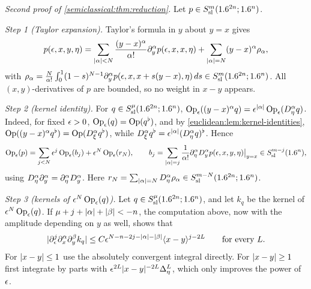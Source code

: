 \emph{Second proof of \cref{semiclassical:thm:reduction}.} Let $p\in S^{m}_{\mathrm{sl}}(1.6^{2n};1.6^n)$.

\emph{Step 1 (Taylor expansion).} Taylor's formula in $y$ about $y=x$ gives
\begin{equation*}
p(\epsilon,x,y,\eta)=\sum_{\lvert \alpha\rvert<N}\frac{(y-x)^\alpha}{\alpha!}\partial^\alpha_yp(\epsilon,x,x,\eta)+\sum_{\lvert \alpha\rvert=N}(y-x)^\alpha\rho_\alpha,
\end{equation*}
with $\rho_\alpha=\frac N{\alpha!}\int_0^1(1-s)^{N-1}\partial^\alpha_yp(\epsilon,x,x+s(y-x),\eta)\,ds\in S^{m}_{\mathrm{sl}}(1.6^{2n};1.6^n)$. All
$(x,y)$-derivatives of $p$ are bounded, so no weight in $x-y$ appears.

\emph{Step 2 (kernel identity).} For $q\in S^{\mu}_{\mathrm{sl}}(1.6^{2n};1.6^n)$,
$\operatorname{Op}_\epsilon((y-x)^\alpha q)=\epsilon^{\lvert \alpha\rvert}\operatorname{Op}_\epsilon(D^\alpha_\eta q)$. Indeed, for fixed $\epsilon>0$,
$\operatorname{Op}_\epsilon(q)=\operatorname{Op}(q^\flat)$, and by \cref{euclidean:lem:kernel-identities},
$\operatorname{Op}((y-x)^\alpha q^\flat)=\operatorname{Op}(D^\alpha_\xi q^\flat)$, while $D^\alpha_\xi q^\flat=\epsilon^{\lvert \alpha\rvert}(D^\alpha_\eta q)^\flat$. Hence
\begin{equation*}
\operatorname{Op}_\epsilon(p)=\sum_{j<N}\epsilon^j\operatorname{Op}_\epsilon(b_j)+\epsilon^N\operatorname{Op}_\epsilon(r_N),\qquad
b_j=\sum_{\lvert \alpha\rvert=j}\frac1{\alpha!}\partial^\alpha_\eta D^\alpha_yp(\epsilon,x,y,\eta)\big|_{y=x}\in S^{m-j}_{\mathrm{sl}}(1.6^n),
\end{equation*}
using $D^\alpha_\eta\partial^\alpha_y=\partial^\alpha_\eta D^\alpha_y$. Here $r_N=\sum_{\lvert \alpha\rvert=N}D^\alpha_\eta\rho_\alpha\in S^{m-N}_{\mathrm{sl}}(1.6^{2n};1.6^n)$.

\emph{Step 3 (kernels of $\epsilon^N\operatorname{Op}_\epsilon(q)$).} Let $q\in S^{\mu}_{\mathrm{sl}}(1.6^{2n};1.6^n)$, and let $k_q$ be the kernel of
$\epsilon^N\operatorname{Op}_\epsilon(q)$. If $\mu+j+\lvert \alpha\rvert+\lvert \beta\rvert<-n$, the computation above, now with the amplitude
depending on $y$ as well, shows that
\begin{equation*}
\lvert \partial^j_\epsilon\partial^\alpha_x\partial^\beta_yk_q\rvert\le C\epsilon^{N-n-2j-\lvert \alpha\rvert-\lvert \beta\rvert}\langle x-y\rangle^{j-2L}\qquad\text{for every }L .
\end{equation*}
For $\lvert x-y\rvert\le1$ use the absolutely convergent integral directly. For $\lvert x-y\rvert\ge1$ first
integrate by parts with $\epsilon^{2L}\lvert x-y\rvert^{-2L}\Delta^L_\eta$, which only improves the power of
$\epsilon$.

